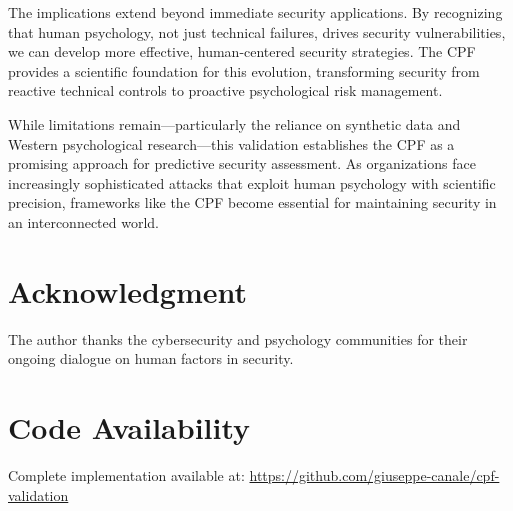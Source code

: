 \documentclass[10pt,twocolumn]{IEEEtran}
\begin{document}
The implications extend beyond immediate security applications. By recognizing that human psychology, not just technical failures, drives security vulnerabilities, we can develop more effective, human-centered security strategies. The CPF provides a scientific foundation for this evolution, transforming security from reactive technical controls to proactive psychological risk management.

While limitations remain---particularly the reliance on synthetic data and Western psychological research---this validation establishes the CPF as a promising approach for predictive security assessment. As organizations face increasingly sophisticated attacks that exploit human psychology with scientific precision, frameworks like the CPF become essential for maintaining security in an interconnected world.

\section*{Acknowledgment}

The author thanks the cybersecurity and psychology communities for their ongoing dialogue on human factors in security.

\section*{Code Availability}

Complete implementation available at: \url{https://github.com/giuseppe-canale/cpf-validation}



\end{document}
